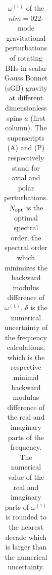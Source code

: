 \documentclass[aps,prx,amsmath,floats,floatfix,twocolumn,
  superscriptaddress,nofootinbib,showpacs]{revtex4-1}
\begin{document}
\begin{table}[htb]
{\begin{tabular}{c|c|c|c|c|c|c|c}
\end{tabular}
}
\caption{
\label{tab:omega_1_022}
$\omega^{(1)}$ of the $nlm=022$-mode gravitational perturbations of rotating BHs in scalar Gauss Bonnet (sGB) gravity at different dimensionless spins $a$ (first column). 
The superscripts (A) and (P) respectively stand for axial and polar perturbations. 
$N_{\rm opt}$ is the optimal spectral order, the spectral order which minimizes the backward modulus difference of $\omega^{(1)}$. 
$\delta$ is the numerical uncertainty of the frequency calculations, which is the respective minimal backward modulus difference of the real and imaginary parts of the frequency. 
The numerical value of the real and imaginary parts of $\omega^{(1)}$ is rounded to the nearest decade which is larger than the numerical uncertainty. 
}
\end{table}
\end{document}
